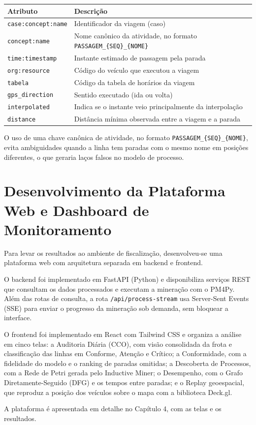 \begin{tabframed}[htb]
\caption{Atributos do Log de Eventos}
\label{quad:log}
\begin{tabular}{|p{3.6cm}|p{10cm}|}
\hline
\textbf{Atributo} & \textbf{Descrição} \\ \hline
\texttt{case:concept:name} & Identificador da viagem (caso) \\ \hline
\texttt{concept:name} & Nome canônico da atividade, no formato \texttt{PASSAGEM\_\{SEQ\}\_\{NOME\}} \\ \hline
\texttt{time:timestamp} & Instante estimado de passagem pela parada \\ \hline
\texttt{org:resource} & Código do veículo que executou a viagem \\ \hline
\texttt{tabela} & Código da tabela de horários da viagem \\ \hline
\texttt{gps\_direction} & Sentido executado (ida ou volta) \\ \hline
\texttt{interpolated} & Indica se o instante veio principalmente da interpolação \\ \hline
\texttt{distance} & Distância mínima observada entre a viagem e a parada \\ \hline
\end{tabular}
\fonte{}
\end{tabframed}

O uso de uma chave canônica de atividade, no formato \texttt{PASSAGEM\_\{SEQ\}\_\{NOME\}}, evita ambiguidades quando a linha tem paradas com o mesmo nome em posições diferentes, o que geraria laços falsos no modelo de processo.

\section{Desenvolvimento da Plataforma Web e Dashboard de Monitoramento}\label{sec:plataformaWeb}

Para levar os resultados ao ambiente de fiscalização, desenvolveu-se uma plataforma web com arquitetura separada em backend e frontend.

O backend foi implementado em FastAPI (Python) e disponibiliza serviços REST que consultam os dados processados e executam a mineração com o PM4Py. Além das rotas de consulta, a rota \texttt{/api/process-stream} usa Server-Sent Events (SSE) para enviar o progresso da mineração sob demanda, sem bloquear a interface.

O frontend foi implementado em React com Tailwind CSS e organiza a análise em cinco telas: a Auditoria Diária (CCO), com visão consolidada da frota e classificação das linhas em Conforme, Atenção e Crítico; a Conformidade, com a fidelidade do modelo e o ranking de paradas omitidas; a Descoberta de Processos, com a Rede de Petri gerada pelo Inductive Miner; o Desempenho, com o Grafo Diretamente-Seguido (DFG) e os tempos entre paradas; e o Replay geoespacial, que reproduz a posição dos veículos sobre o mapa com a biblioteca Deck.gl.

A plataforma é apresentada em detalhe no Capítulo 4, com as telas e os resultados.

